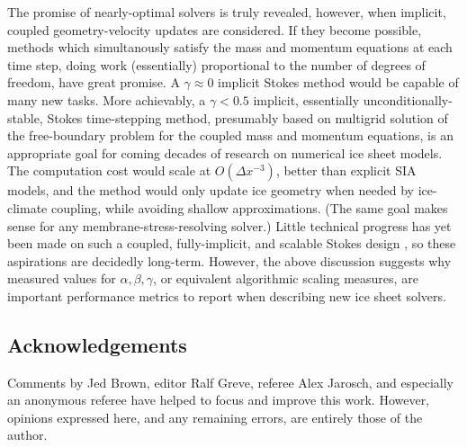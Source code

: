\documentclass[review]{igs}
\begin{document}
The promise of nearly-optimal solvers is truly revealed, however, when implicit, coupled geometry-velocity updates are considered.  If they become possible, methods which simultanously satisfy the mass and momentum equations at each time step, doing work (essentially) proportional to the number of degrees of freedom, have great promise.  A $\gamma \approx 0$ implicit Stokes method would be capable of many new tasks.  More achievably, a $\gamma < 0.5$ implicit, essentially unconditionally-stable, Stokes time-stepping method, presumably based on multigrid solution of the free-boundary problem for the coupled mass and momentum equations, is an appropriate goal for coming decades of research on numerical ice sheet models.  The computation cost would scale at $O(\Delta x^{-3})$, better than explicit SIA models, and the method would only update ice geometry when needed by ice-climate coupling, while avoiding shallow approximations.  (The same goal makes sense for any membrane-stress-resolving solver.)  Little technical progress has yet been made on such a coupled, fully-implicit, and scalable Stokes design \cite[but see][]{WirbelJarosch2020}, so these aspirations are decidedly long-term.  However, the above discussion suggests why measured values for $\alpha,\beta,\gamma$, or equivalent algorithmic scaling measures, are important performance metrics to report when describing new ice sheet solvers.

\subsection{Acknowledgements}  Comments by Jed Brown, editor Ralf Greve, referee Alex Jarosch, and especially an anonymous referee have helped to focus and improve this work.  However, opinions expressed here, and any remaining errors, are entirely those of the author.



\end{document}
